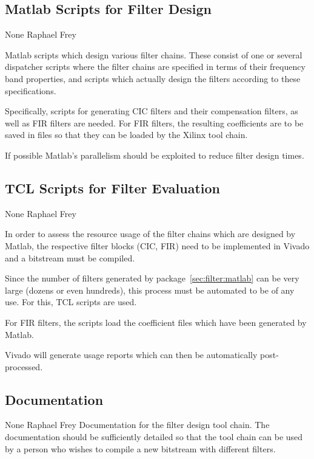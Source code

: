 \documentclass[a4paper,oneside]{alpenspecs/alpenspecs}
\begin{document}
\subsection{Matlab Scripts for Filter Design}
\label{subsec:filter:matlab}

\wpac
     {}
     {}
     {}
     {None}
     {}
     {Raphael Frey}
     {%
         Matlab scripts which design various filter chains. These consist of one
         or several dispatcher scripts where the filter chains are specified in
         terms of their frequency band properties, and scripts which actually
         design the filters according to these specifications.

         Specifically, scripts for generating CIC filters and their compensation
         filters, as well as FIR filters are needed. For FIR filters, the resulting
         coefficients are to be saved in files so that they can be loaded by the
         Xilinx tool chain.

         If possible Matlab's parallelism should be exploited to reduce filter
         design times.
     }

\subsection{TCL Scripts for Filter Evaluation}
\label{subsec:filter:tcl}

\wpac
     {}
     {}
     {}
     {None}
     {}
     {Raphael Frey}
     {%
        In order to assess the resource usage of the filter chains which are
        designed by Matlab, the respective filter blocks (CIC, FIR) need to be
        implemented in Vivado and a bitstream must be compiled.

        Since the number of filters generated by package~\ref{sec:filter:matlab}
        can be very large (dozens or even hundreds), this process must be automated
        to be of any use. For this, TCL scripts are used.

        For FIR filters, the scripts load the coefficient files which have been
        generated by Matlab.

        Vivado will  generate usage  reports which  can then  be automatically
        post-processed.
     }


\subsection{Documentation}
\label{subsec:filter:doc}

\wpac
     {}
     {}
     {}
     {None}
     {}
     {Raphael Frey}
     {%
         Documentation  for the  filter design  tool chain. The  documentation
         should be sufficiently detailed so that the tool chain can be used by
         a  person  who wishes  to  compile  a  new bitstream  with  different
         filters.
     }
\end{document}
